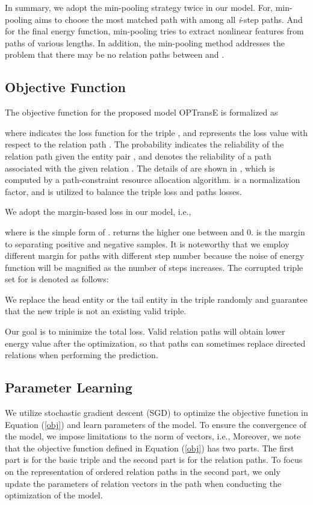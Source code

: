 \documentclass[11pt,a4paper]{article}
\begin{document}
In summary, we adopt the min-pooling strategy twice in our model.
For, min-pooling aims to choose
the most matched path with  among all \emph{i}-step paths. And
for the final energy function, min-pooling tries to extract
nonlinear features from paths of various lengths. In addition, the
min-pooling method addresses the problem that there may be no
relation paths between  and .

\subsection{Objective Function}

The objective function for the proposed model OPTransE is formalized
as

where  indicates the loss function for the
triple , and  represents the
loss value with respect to the relation path . The
probability  indicates the
reliability of the relation path  given the entity pair
, and  denotes the reliability of a path
 associated with the given relation . The details of   are shown in \cite{lin2015modeling}, which is computed by a path-constraint resource allocation algorithm.  is a normalization
factor, and  is utilized to balance the triple loss and
paths losses.

We adopt the margin-based loss in our model, i.e.,



where  is the simple form of .  returns the higher one between 
and 0.  is the margin to separating positive and
negative samples. It is noteworthy that we employ different margin
 for paths with different step number because the
noise of energy function will be magnified as the number of steps
increases. The corrupted triple set  for  is denoted
as follows:

We replace the head entity or the tail entity in the triple randomly
and guarantee that the new triple is not an existing valid triple.

Our goal is to minimize the total loss. Valid relation paths will
obtain lower energy value after the optimization, so that paths can
sometimes replace directed relations when performing the prediction.

\subsection{Parameter Learning}

We utilize stochastic gradient descent (SGD) to optimize the objective
function in Equation (\ref{obj}) and learn parameters of the model. To ensure the
convergence of the model, we impose limitations to the norm of
vectors, i.e.,  Moreover,
we note that the objective function defined in Equation (\ref{obj})
has two parts. The first part is for the basic triple and the second
part is for the relation paths. To focus on the representation of
ordered relation paths in the second part, we only update the
parameters of relation vectors in the path when conducting the
optimization of the model.
\end{document}
